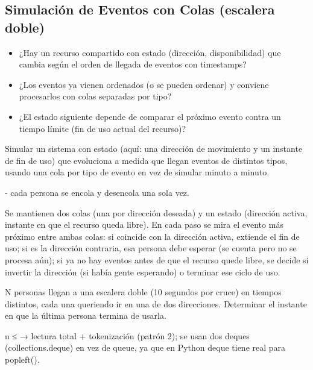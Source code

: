 \subsection{Simulación de Eventos con Colas (escalera doble)}


\begin{itemize}
\item ¿Hay un recurso compartido con estado (dirección, disponibilidad) que cambia según el orden de llegada de eventos con timestamps?
\item ¿Los eventos ya vienen ordenados (o se pueden ordenar) y conviene procesarlos con colas separadas por tipo?
\item ¿El estado siguiente depende de comparar el próximo evento contra un tiempo límite (fin de uso actual del recurso)?
\end{itemize}

 Simular un sistema con estado (aquí: una dirección de movimiento y un instante de fin de uso) que evoluciona a medida que llegan eventos de distintos tipos, usando una cola por tipo de evento en vez de simular minuto a minuto.

  - cada persona se encola y desencola una sola vez.

 Se mantienen dos colas (una por dirección deseada) y un estado (dirección activa, instante en que el recurso queda libre). En cada paso se mira el evento más próximo entre ambas colas: si coincide con la dirección activa, extiende el fin de uso; si es la dirección contraria, esa persona debe esperar (se cuenta pero no se procesa aún); si ya no hay eventos antes de que el recurso quede libre, se decide si invertir la dirección (si había gente esperando) o terminar ese ciclo de uso.


N personas llegan a una escalera doble (10 segundos por cruce) en tiempos distintos, cada una queriendo ir en una de dos direcciones. Determinar el instante en que la última persona termina de usarla.

 n ≤  → lectura total + tokenización (patrón 2); se usan dos deques (collections.deque) en vez de queue, ya que en Python deque tiene  real para popleft().


